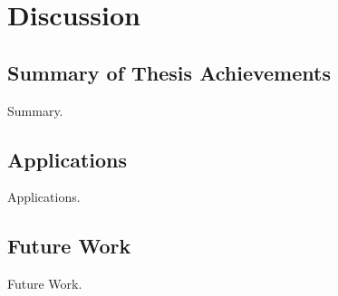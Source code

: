 
\section{Discussion}


\subsection{Summary of Thesis Achievements}

Summary.


\subsection{Applications}

Applications.


\subsection{Future Work}

Future Work.
